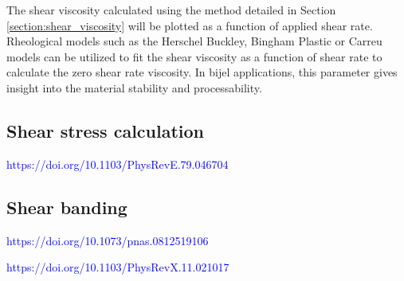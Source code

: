 The shear viscosity calculated using the method detailed in Section \ref{section:shear_viscosity} will be plotted as a 
function of applied shear rate. Rheological models such as the Herschel Buckley, Bingham Plastic or Carreu models can be 
utilized to fit the shear viscosity as a function of shear rate to calculate the zero shear rate viscosity. In bijel 
applications, this parameter gives insight into the material stability and processability.

\subsection{Shear stress calculation}

\textcolor{blue}{https://doi.org/10.1103/PhysRevE.79.046704}



\subsection{Shear banding}
\label{section:shear_banding}

\textcolor{blue}{https://doi.org/10.1073/pnas.0812519106}

\textcolor{blue}{https://doi.org/10.1103/PhysRevX.11.021017}